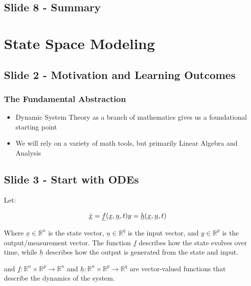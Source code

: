 \documentclass[
  letterpaper,
  DIV=11,
  numbers=noendperiod]{scrreprt}
\providecommand{\tightlist}{%
  \setlength{\itemsep}{0pt}\setlength{\parskip}{0pt}}
\begin{document}
\section{Slide 8 - Summary}\label{slide-8---summary}


\chapter{State Space Modeling}\label{state-space-modeling}

\section{Slide 2 - Motivation and Learning
Outcomes}\label{slide-2---motivation-and-learning-outcomes-3}

\subsection{The Fundamental
Abstraction}\label{the-fundamental-abstraction}

\begin{itemize}
\tightlist
\item
  Dynamic System Theory as a branch of mathematics gives us a
  foundational starting point
\item
  We will rely on a variety of math tools, but primarily Linear Algebra
  and Analysis
\end{itemize}

\section{Slide 3 - Start with ODEs}\label{slide-3---start-with-odes}

Let:

\[\dot{\underline{x}} = \underline{f}(\underline{x},\underline{u},t) \\
y = \underline{h}(\underline{x},\underline{u},t)\]

Where \(\underline{x} \in \mathbb{R}^n\) is the state vector,
\(\underline{u} \in \mathbb{R}^q\) is the input vector, and
\(y \in \mathbb{R}^p\) is the output/measurement vector. The function
\(\underline{f}\) describes how the state evolves over time, while
\(\underline{h}\) describes how the output is generated from the state
and input.

and \(\underline{f}: \mathbb{R}^n \times \mathbb{R}^p \to \mathbb{R}^n\)
and \(\underline{h}: \mathbb{R}^n \times \mathbb{R}^p \to \mathbb{R}^q\)
are vector-valued functions that describe the dynamics of the system.
\end{document}
